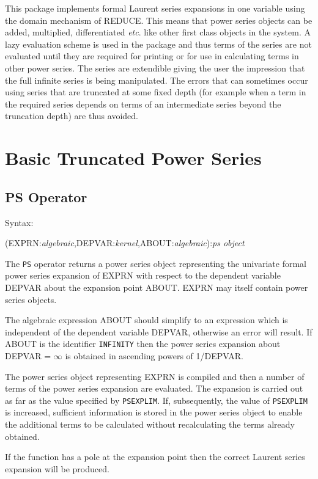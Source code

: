 \documentclass[11pt,letterpaper]{book}
\newcommand{\REDUCE}{REDUCE}
\begin{document}
This package implements formal Laurent series expansions in one
variable using the domain mechanism of \REDUCE.  This means that power
series objects can be added, multiplied, differentiated {\em etc}. like other
first class objects in the system.  A lazy evaluation scheme is used in
the package and thus terms of the series are not evaluated until they
are required for printing or for use in calculating terms in other
power series.  The series are extendible giving the user the impression
that the full infinite series is being manipulated.  The errors that
can sometimes occur using series that are truncated at some fixed depth
(for example when a term in the required series depends on terms of an
intermediate series beyond the truncation depth) are thus avoided.
\newpage
\section{Basic Truncated Power Series}
\subsection{PS Operator}

Syntax:

(EXPRN:{\em algebraic},DEPVAR:{\em kernel},ABOUT:{\em algebraic}):{\em ps object}

The {\tt PS} operator returns a  power series object
representing the univariate formal power series expansion of EXPRN with
respect to the dependent variable DEPVAR about the expansion point
ABOUT.  EXPRN may itself contain power series objects.

The algebraic expression ABOUT should simplify to an expression
which is independent of the dependent variable DEPVAR, otherwise
an error will result.  If ABOUT is the identifier {\tt INFINITY}
then the power series expansion about DEPVAR = $\infty$ is
obtained in ascending powers of 1/DEPVAR.

The power series object
representing EXPRN is compiled and then a number of terms of the
power series expansion are evaluated.  The expansion is
carried out as far as the value specified by {\tt PSEXPLIM}.  If,
subsequently, the value of {\tt PSEXPLIM} is increased, sufficient
information is stored in the power series object to enable the
additional terms to be calculated without recalculating the terms
already obtained.

If the function has a pole at the expansion point then the correct
Laurent series expansion will be produced.
\end{document}
